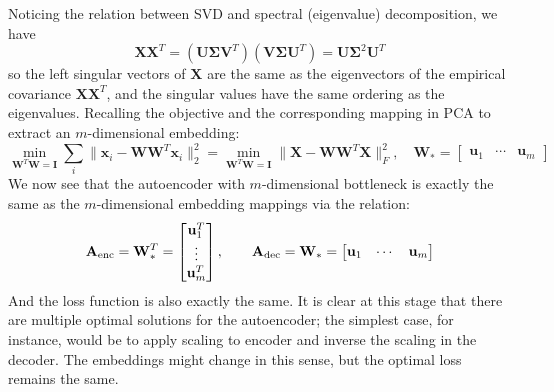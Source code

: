 \documentclass[a4paper, 10pt]{article}
\begin{document}
Noticing the relation between SVD and spectral (eigenvalue) decomposition, we have
\begin{equation}
    \mathbf{X} \mathbf{X}^T = \left(\mathbf{U} \bm{\Sigma} \mathbf{V}^T\right) \left(\mathbf{V} \bm{\Sigma} \mathbf{U}^T\right) = \mathbf{U} \bm{\Sigma}^2 \mathbf{U}^T
\end{equation}
so the left singular vectors of $\mathbf{X}$ are the same as the eigenvectors of the empirical covariance $\mathbf{X} \mathbf{X}^T$, and the singular values have the same ordering as the eigenvalues. Recalling the objective and the corresponding mapping in PCA to extract an $m$-dimensional embedding:
\begin{equation}
    \min_{\mathbf{W}^T \mathbf{W} = \mathbf{I}} \sum_{i} \| \mathbf{x}_i - \mathbf{W}\mathbf{W}^T \mathbf{x}_i\|_2^2 = \min_{\mathbf{W}^T \mathbf{W} = \mathbf{I}} \| \mathbf{X} - \mathbf{W}\mathbf{W}^T \mathbf{X}\|_F^2, \quad \mathbf{W}_* = \begin{bmatrix}
        \mathbf{u}_1 & \cdots & \mathbf{u}_m
    \end{bmatrix}
\end{equation}
We now see that the autoencoder with $m$-dimensional bottleneck is exactly the same as the $m$-dimensional embedding mappings via the relation:
\begin{equation}
    \mathbf{A}_{\rm enc} = \mathbf{W}_*^T = \begin{bmatrix}
        \mathbf{u}_1^T \\ \vdots \\ \mathbf{u}_m^T
    \end{bmatrix}, \qquad 
    \mathbf{A}_{\rm dec} = \mathbf{W}_* = \begin{bmatrix}
        \mathbf{u}_1 & \cdots & \mathbf{u}_m
    \end{bmatrix}
\end{equation}
And the loss function is also exactly the same. It is clear at this stage that there are multiple optimal solutions for the autoencoder; the simplest case, for instance, would be to apply scaling to encoder and inverse the scaling in the decoder. The embeddings might change in this sense, but the optimal loss remains the same.
\end{document}
